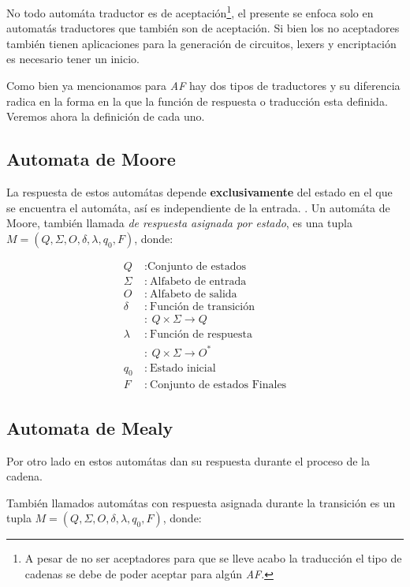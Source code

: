 \documentclass[11pt,letterpaper]{article}
\begin{document}
\begin{multicols}{2}
  No todo automáta traductor es de aceptación\footnote{A pesar de
  no ser aceptadores para que se lleve acabo la traducción el tipo de cadenas
  se debe de poder aceptar para algún {\it AF}.\cite{Viso}}, el presente se enfoca
  solo en automatás traductores que también son de aceptación. Si bien
  los no aceptadores también tienen aplicaciones para la generación de
  circuitos, lexers y encriptación es necesario tener un inicio.
  
  Como bien ya mencionamos para {\it AF} hay dos tipos de traductores y su
  diferencia radica en la forma en la que la función de respuesta o traducción
  esta definida. Veremos ahora la definición de cada uno.
  
  \subsection{Automata de Moore}

  La respuesta de estos automátas depende {\bf exclusivamente} del estado
  en el que se encuentra el automáta, así es independiente de la entrada.
. Un automáta de Moore, también llamada
  {\it de respuesta asignada por estado}, es una tupla
  $M =(Q,\Sigma, O, \delta, \lambda, q_0, F)$, donde:

  \begin{align*}
    Q\ &: \text{Conjunto de estados}\\
    \Sigma\ &:\  \text{Alfabeto de entrada}\\
    O\ &:\  \text{Alfabeto de salida}\\
    \delta\ &:\  \text{Función de transición}\\
    &:\  Q\times \Sigma \rightarrow Q\\
    \lambda &:\  \text{Función de respuesta}\\
    &:\  Q\times \Sigma\rightarrow O^*\\
    q_0\ &:\  \text{Estado inicial}\\
    F\ &:\  \text{Conjunto de estados Finales}
  \end{align*}
  
  \subsection{Automata de Mealy}
  
  Por otro lado en estos automátas dan su respuesta durante el proceso de la cadena.

  También llamados automátas con respuesta asignada durante la transición es un tupla
  $M =(Q,\Sigma, O, \delta, \lambda, q_0, F)$, donde:


\end{multicols}
\end{document}

